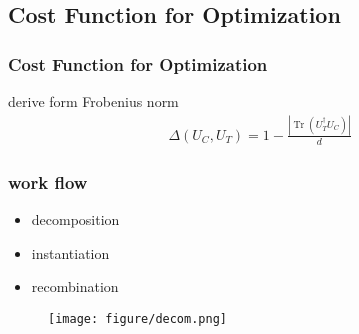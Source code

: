 \subsection{Cost Function for Optimization}

\begin{frame}
\frametitle{Cost Function for Optimization}
derive form Frobenius norm
\begin{align}
  \Delta\left(U_{C}, U_{T}\right)=1-\frac{\left|\operatorname{Tr}\left(U_{T}^{\dagger} U_{C}\right)\right|}{d}
\end{align}
\end{frame}

\begin{frame}
  \frametitle{work flow}
  \begin{itemize}
    \item decomposition
    \item instantiation
    \item recombination
  \end{itemize}
  \begin{figure}
    \texttt{[image: figure/decom.png]}
  \end{figure}
\end{frame}

